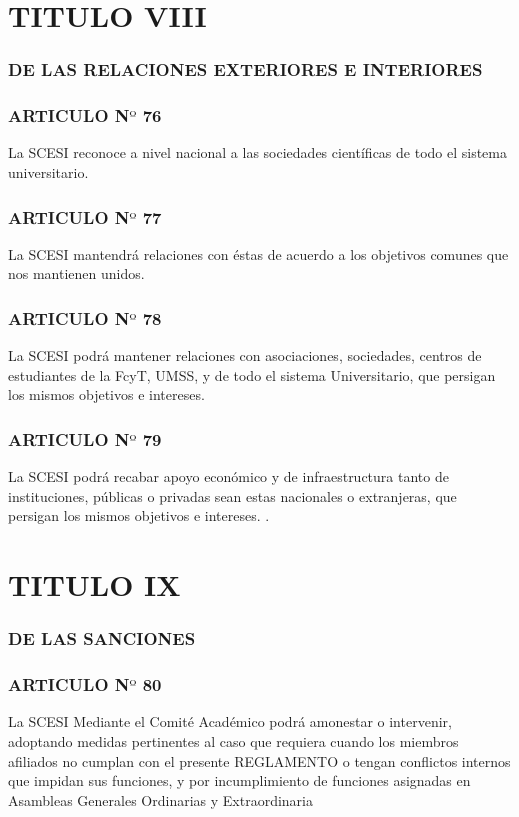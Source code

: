 \documentclass[11pt,letterpaper]{book}
\begin{document}
\section*{TITULO VIII}
\subsubsection*{DE LAS RELACIONES EXTERIORES E INTERIORES}
\subsubsection*{ARTICULO N$º$ 76}
La SCESI reconoce a nivel nacional a las sociedades científicas de todo el sistema universitario. 
\subsubsection*{ARTICULO N$º$ 77}
La SCESI mantendrá relaciones con éstas de acuerdo a los objetivos comunes que nos mantienen unidos. 
\subsubsection*{ARTICULO N$º$ 78}
La SCESI podrá mantener relaciones con asociaciones, sociedades, centros de estudiantes de la FcyT, UMSS, y de todo el sistema Universitario, que persigan los mismos objetivos e intereses. 
\subsubsection*{ARTICULO N$º$ 79}
La SCESI podrá recabar apoyo económico y de infraestructura tanto de instituciones, públicas o privadas sean estas nacionales o extranjeras, que persigan los mismos objetivos e intereses. . 
\section*{TITULO IX}
\subsubsection*{DE LAS SANCIONES}
\subsubsection*{ARTICULO N$º$ 80} 
La SCESI Mediante el Comité Académico podrá amonestar o intervenir, adoptando medidas pertinentes al caso que requiera cuando los miembros afiliados no cumplan con el presente REGLAMENTO o tengan conflictos internos que impidan sus funciones, y por incumplimiento de funciones asignadas en Asambleas Generales Ordinarias y Extraordinaria 
\end{document}
